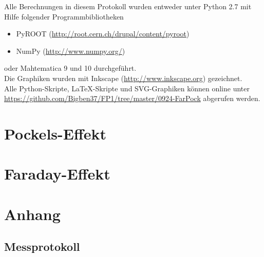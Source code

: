 \documentclass[12pt, a4paper]{scrartcl}
\title{\exptitle}
\subtitle{Fortgeschrittenen-Praktikum 1}
\author{Moritz Bitterling und Benjamin Rottler \\ Universität Freiburg}
\date{\expdate}
\numberwithin{equation}{section} %
\numberwithin{table}{section}    %
\begin{document}
\hypersetup{pageanchor=false} %

\thispagestyle{empty}

\newpage
Alle Berechnungen in diesem Protokoll wurden entweder unter Python 2.7 mit Hilfe folgender Programmbibliotheken
\begin{itemize}
  \item PyROOT (\url{http://root.cern.ch/drupal/content/pyroot})
  \item NumPy (\url{http://www.numpy.org/})
\end{itemize}
oder Mahtematica 9 und 10 durchgeführt. \\
Die Graphiken wurden mit Inkscape (\url{http://www.inkscape.org}) gezeichnet.\\[\baselineskip]
Alle Python-Skripte, \LaTeX-Skripte und SVG-Graphiken können online unter \\
\url{https://github.com/Bigben37/FP1/tree/master/0924-FarPock} abgerufen werden.
\thispagestyle{empty}

\newpage
\tableofcontents
\thispagestyle{empty}

\newpage
\hypersetup{pageanchor=true} %
\setcounter{page}{1} %

 

\section{Pockels-Effekt}





\section{Faraday-Effekt}





\newpage



\appendix
\section{Anhang}
\subsection{Messprotokoll}

\end{document}
